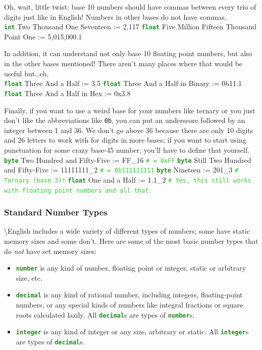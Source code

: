 \documentclass{article}
\newcommand{\English}{\textbackslash{}English}				%
\newcommand{\sssecl}[1]{\subsubsection{#1}\label{sssec:#1}}
\newcommand{\codecomment}[1]{\texttt{\textcolor{LimeGreen}{#1}}}
\newcommand{\commentline}[1]{\codecomment{\# #1}}
\newcommand{\type}[1]{\texttt{\textcolor{ForestGreen}{\textbf{#1}}}}
\newenvironment{code}[0]
{\ttfamily{}				%
\setlength\parindent{0cm}	%
~\\}
{\setlength\parindent{1cm}
~\\}
\begin{document}
\indent Oh, wait, little twist: base 10 numbers should have commas between every trio of digits just like in English! Numbers in other bases do not have commas.
\begin{code}
\type{int} Two Thousand One Seventeen := 2,117
\type{float} Five Million Fifteen Thousand Point One := 5,015,000.1
\end{code}

\indent In addition, it can understand not only base 10 floating point numbers, but also in the other bases mentioned! There aren't many places where that would be useful but\ldots eh.
\begin{code}
\type{float} Three And a Half := 3.5
\type{float} Three And a Half in Binary := 0b11.1
\type{float} Three And a Half in Hex := 0x3.8
\end{code}

\indent Finally, if you want to use a weird base for your numbers like ternary or you just don't like the abbreviations like \texttt{0b}, you can put an underscore followed by an integer between 1 and 36. We don't go above 36 because there are only 10 digits and 26 letters to work with for digits in more bases; if you want to start using punctuation for some crazy base-45 number, you'll have to define that yourself.
\begin{code}
\type{byte} Two Hundred and Fifty-Five := FF\_16 \commentline{ = 0xFF}
\type{byte} Still Two Hundred and Fifty-Five := 11111111\_2 \commentline{ = 0b111111111}
\type{byte} Nineteen := 201\_3 \commentline{Ternary (base 3)!}
\type{float} One and a Half := 1.1\_2 \commentline{Yes, this still works with floating point numbers and all that.}
\end{code}

\sssecl{Standard Number Types}
\indent \English{} includes a wide variety of different types of numbers; some have static memory sizes and some don't. Here are some of the most basic number types that do \emph{not} have set memory sizes:
\begin{itemize}
	\item \type{number} is any kind of number, floating point or integer, static or arbitrary size, etc.
	\item \type{decimal} is any kind of rational number, including integers, floating-point numbers, or any special kinds of numbers like integral fractions or square roots calculated lazily. All \type{decimal}s are types of \type{number}s.
	\item \type{integer} is any kind of integer or any size, arbitrary or static. All \type{integer}s are types of \type{decimal}s.
\end{itemize}
\end{document}
